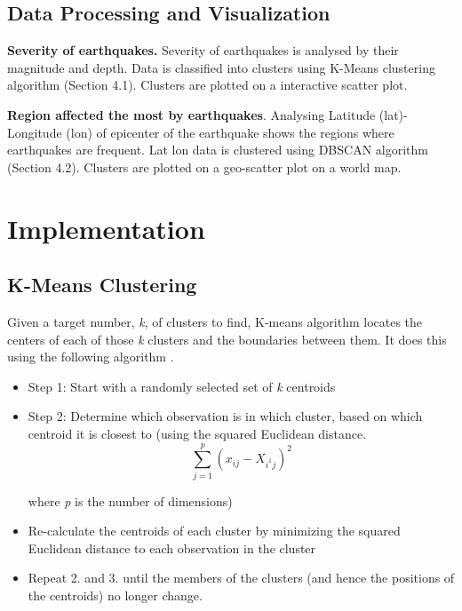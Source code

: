 \documentclass[9pt,twocolumn,twoside]{../../styles/osajnl}
\begin{document}
\subsection{Data Processing and Visualization}

{\bfseries Severity of earthquakes.} Severity of earthquakes is analysed by their magnitude and depth. Data is classified into clusters using K-Means clustering algorithm (Section 4.1). Clusters are plotted on a interactive scatter plot.

{\bfseries Region affected the most by earthquakes}. Analysing Latitude (lat)-Longitude (lon) of epicenter of the earthquake shows the regions where earthquakes are frequent. Lat lon data is clustered using DBSCAN algorithm (Section 4.2). Clusters are plotted on a geo-scatter plot on a world map.

\section{Implementation}

\subsection{K-Means Clustering}
Given a target number, \emph k, of clusters to find, K-means algorithm locates the centers of each of those \emph k clusters and the boundaries between them. It does this using the following algorithm \cite{www-kmeans}.
\begin{itemize}
    
    \item Step 1: Start with a randomly selected set of \emph k centroids 

    \item Step 2: Determine which observation is in which cluster, based on which centroid it is closest to (using the squared Euclidean distance. 
    \[   \sum_{j=1}^p (x_{ij} - X_{i^1j})^2   \]
    
    where \emph p is the number of dimensions)
    
    \item Re-calculate the centroids of each cluster by minimizing the squared Euclidean distance to each observation in the cluster
    
    \item Repeat 2. and 3. until the members of the clusters (and hence the positions of the centroids) no longer change.

\end{itemize}
\end{document}
